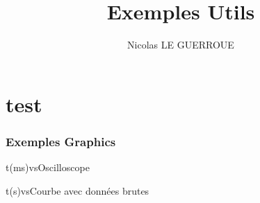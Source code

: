 \documentclass[12pt]{report}
\begin{document}
\title{Exemples Utils}
\author{Nicolas LE GUERROUE}
\maketitle
\tableofcontents
\newpage


\part{test}
\section{Exemples Graphics}


\begin{exemple}
\begin{graphics}{0.8}{0.6}{0}{2.1}{-1.1}{1.1}{t(ms)}{vs}{Oscilloscope}
\end{graphics}
\end{exemple}


\begin{exemple}
\begin{graphics}{0.8}{0.4}{0}{40}{-1}{6}{t(s)}{vs}{Courbe avec données brutes}
\end{graphics}
\end{exemple}
\end{document}

